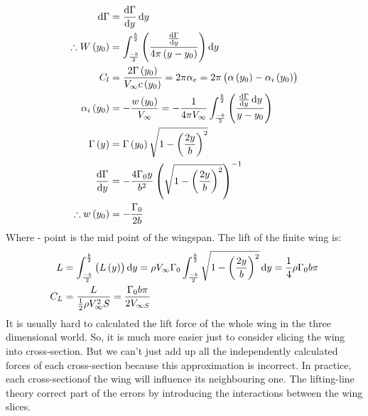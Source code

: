 \begin{align}
    \dif \Gamma                  & = \frac{\dif \Gamma}{\dif y} \dif y                                                                                                                                      \\
    \therefore W\left(y_0\right) & = \int_{\frac{-b}{2}}^{\frac{b}{2}} \left(\frac{\frac{\dif \Gamma}{\dif y}}{4\pi \left(y-y_0\right)}\right) \dif y                                                       \\
    C_l                          & = \frac{2\Gamma\left(y_0\right)}{V_{\infty}c\left(y_0\right)} = 2\pi \alpha_e = 2\pi\left(\alpha\left(y_0\right) - \alpha_i \left(y_0\right)\right)                      \\
    \alpha_i \left( y_0 \right)  & = -\frac{w\left( y_0 \right)}{V_{\infty}} = -\frac{1}{4\pi V_{\infty}} \int_{\frac{-b}{2}}^{\frac{b}{2}} \left( \frac{\frac{\dif \Gamma}{\dif y}\dif y}{y - y_0} \right) \\
    \Gamma \left(y\right)        & = \Gamma \left(y_0\right) \sqrt{1 - \left(\frac{2y}{b}\right)^2}                                                                                                         \\
    \frac{\dif \Gamma}{\dif y}   & = -\frac{4\Gamma_0 y}{b^2} \left(\sqrt{1-\left(\frac{2y}{b}\right)^2}\right)^{-1}                                                                                        \\
    \therefore w\left(y_0\right) & = -\frac{\Gamma_0}{2b}
\end{align}
Where - point is the mid point of the wingspan. The lift of the finite wing is:
\begin{align}
    L   & = \int_{\frac{-b}{2}}^{\frac{b}{2}} \left(L\left(y\right)\right)\dif y = \rho V_{\infty} \Gamma_0 \int_{\frac{-b}{2}}^{\frac{b}{2}} \sqrt{1-\left(\frac{2y}{b}\right)^2} \dif y = \frac{1}{4}\rho \Gamma_0 b\pi \\
    C_L & = \frac{L}{\frac{1}{2}\rho V_{\infty}^2 S} = \frac{\Gamma_0 b \pi}{2V_{\infty S}}
\end{align}
It is usually hard to calculated the lift force of the whole wing in the three dimensional world. So, it is much more easier just to consider slicing the wing into cross-section. But we can’t just add up all the independently calculated forces of each cross-section because this approximation is incorrect. In practice, each cross-sectionof the wing will influence its neighbouring one. The lifting-line theory correct part of the errors by introducing the interactions between the wing slices.

